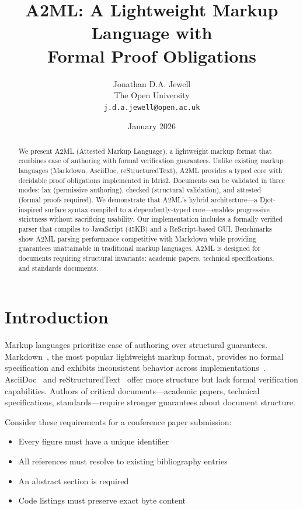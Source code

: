 \documentclass[10pt,twocolumn]{article}
\title{A2ML: A Lightweight Markup Language with \\
Formal Proof Obligations}
\author{
  Jonathan D.A. Jewell \\
  The Open University \\
  \texttt{j.d.a.jewell@open.ac.uk}
}
\date{January 2026}
\begin{document}
\maketitle

\begin{abstract}
We present A2ML (Attested Markup Language), a lightweight markup format that combines ease of authoring with formal verification guarantees. Unlike existing markup languages (Markdown, AsciiDoc, reStructuredText), A2ML provides a typed core with decidable proof obligations implemented in Idris2. Documents can be validated in three modes: lax (permissive authoring), checked (structural validation), and attested (formal proofs required). We demonstrate that A2ML's hybrid architecture—a Djot-inspired surface syntax compiled to a dependently-typed core—enables progressive strictness without sacrificing usability. Our implementation includes a formally verified parser that compiles to JavaScript (45KB) and a ReScript-based GUI. Benchmarks show A2ML parsing performance competitive with Markdown while providing guarantees unattainable in traditional markup languages. A2ML is designed for documents requiring structural invariants: academic papers, technical specifications, and standards documents.
\end{abstract}

\section{Introduction}

Markup languages prioritize ease of authoring over structural guarantees. Markdown~\cite{markdown}, the most popular lightweight markup format, provides no formal specification and exhibits inconsistent behavior across implementations~\cite{commonmark}. AsciiDoc~\cite{asciidoc} and reStructuredText~\cite{rst} offer more structure but lack formal verification capabilities. Authors of critical documents—academic papers, technical specifications, standards—require stronger guarantees about document structure.

Consider these requirements for a conference paper submission:
\begin{itemize}
  \item Every figure must have a unique identifier
  \item All references must resolve to existing bibliography entries
  \item An abstract section is required
  \item Code listings must preserve exact byte content
\end{itemize}
\end{document}
